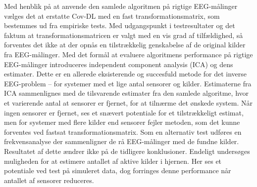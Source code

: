 Med henblik på at anvende den samlede algoritmen på rigtige EEG-målinger vælges det at erstatte Cov-DL med en fast transformationsmatrix, som bestemmes ud fra empiriske tests. 
Med udgangspunkt i testresultater og det faktum at transformationsmatricen er valgt med en vis grad af tilfældighed, så forventes det ikke at der opnås en tilstrækkelig genskabelse af de original kilder fra EEG-målinger. 
Med det formål at evaluere algoritmens performance på rigtige EEG-målinger introduceres independent component analysis (ICA) og dens estimater. 
Dette er en allerede eksisterende og succesfuld metode for det inverse EEG-problem – for systemer med et lige antal sensorer og kilder. 
Estimaterne fra ICA sammenlignes med de tilsvarende estimater fra den samlede algoritme, hvor et varierende antal at sensorer er fjernet, for at tilnærme det ønskede system. 
Når ingen sensorer er fjernet, ses et snævert potentiale for et tilstrækkeligt estimat, men for systemer med flere kilder end sensorer fejler metoden, som det kunne forventes ved fastsat transformationsmatrix. 
Som en alternativ test udføres en frekvensanalyse der sammenligner de rå EEG-målinger med de fundne kilder. Resultatet af dette ændrer ikke på de tidligere konklusioner.
Endeligt undersøges muligheden for at estimere antallet af aktive kilder i hjernen. Her ses et potentiale ved test på simuleret data, dog forringes denne performance når antallet af sensorer reduceres.   

